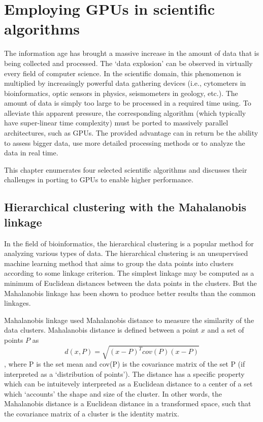 \chapter{Employing GPUs in scientific algorithms}

The information age has brought a massive increase in the amount of data that is being collected and processed. The `data explosion' can be observed in virtually every field of computer science. In the scientific domain, this phenomenon is multiplied by increasingly powerful data gathering devices (i.e., cytometers in bioinformatics, optic sensors in physics, seismometers in geology, etc.). The amount of data is simply too large to be processed in a required time using. To alleviate this apparent pressure, the corresponding algorithm (which typically have super-linear time complexity) must be ported to massively parallel architectures, such as GPUs. The provided advantage can in return be the ability to assess bigger data, use more detailed processing methods or to analyze the data in real time.

This chapter enumerates four selected scientific algorithms and discusses their challenges in porting to GPUs to enable higher performance.

\section{Hierarchical clustering with the Ma\-ha\-la\-no\-bis linkage}

In the field of bioinformatics, the hierarchical clustering is a popular method for analyzing various types of data. 
The hierarchical clustering is an unsupervised machine learning method that aims to group the data points into clusters according to some linkage criterion. 
The simplest linkage may be computed as a minimum of Euclidean distances between the data points in the clusters.
But the Mahalanobis linkage has been shown to produce better results than the common linkages.

Mahalanobis linkage used Mahalanobis distance to measure the similarity of the data clusters. Mahalanobis distance is defined between a point $x$ and a set of points $P$ as
$$ d(x, P) = \sqrt{(x - P)^Tcov(P)(x - P)}$$,
where P is the set mean and cov(P) is the covariance matrix of the set P (if interpreted as a `distribution of points').
The distance has a specific property which can be intuitevely interpreted as a Euclidean distance to a center of a set which `accounts' the shape and size of the cluster. In other words, the Mahalanobis distance is a Euclidean distance in a transformed space, such that the covariance matrix of a cluster is the identity matrix.

